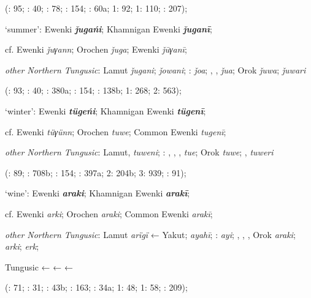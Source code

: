 \documentclass[output=paper,colorlinks,citecolor=brown]{langscibook}
\begin{document}
\begin{xlist}
    (\citealt{Castrén1856}: 95; \citealt{Janhunen1991}: 40; \citealt{Dorji1998}: 78; \citealt{Chaoke2014a}: 154; \citealt{Vasilevic1958}: 60a; \citealt{Cincius1975B} 1: 92; \citealt{Hauer1952} 1: 110; \citealt{Zikmundová2013a}: 207);

    \ex  ‘summer’:  Ewenki \textbf{\textit{ǰugańi}}; Khamnigan Ewenki \textbf{\textit{ǰuganī}};

    cf.  Ewenki \textit{ǰuγann}; Orochen \textit{ǰuga};  Ewenki \textit{ǰūγanī};

    \textit{other Northern Tungusic}: Lamut \textit{ǰugani};  \textit{ǰowani}; \textit{}:  \textit{ǰoa}; , ,  \textit{ǰua}; Orok \textit{ǰuwa};  \textit{ǰuwari} 
    
    (\citealt{Castrén1856}: 93; \citealt{Janhunen1991}: 40; \citealt{Dorji1998}: 380a; \citealt{Chaoke2014a}: 154; \citealt{Vasilevic1958}: 138b; \citealt{Cincius1975B} 1: 268; \citealt{Hauer1952} 2: 563);

    \ex  ‘winter’:  Ewenki \textbf{\textit{tügeńi}}; Khamnigan Ewenki \textbf{\textit{tügenī}};

    cf.  Ewenki \textit{tüγünn}; Orochen \textit{tuwe};  Common Ewenki \textit{tugenī};

    \textit{other Northern Tungusic}: Lamut,  \textit{tuweni}; \textit{}: , , ,  \textit{tue}; Orok \textit{tuwe}; ,  \textit{tuweri} 
    
    (\citealt{Castrén1856}: 89; \citealt{Dorji1998}: 708b; \citealt{Chaoke2014a}: 154; \citealt{Vasilevic1958}: 397a; \citealt{Cincius1975B} 2: 204b; \citealt{Hauer1952} 3: 939; \citealt{Stary1990}: 91);

    \ex  ‘wine’:  Ewenki \textbf{\textit{araki}}; Khamnigan Ewenki \textbf{\textit{arakī}};

    cf.  Ewenki \textit{arki}; Orochen \textit{araki};  Common Ewenki \textit{arakī};

    \textit{other Northern Tungusic}: Lamut \textit{arïgï} ← Yakut;  \textit{ayahī}; \textit{}:  \textit{ayi}; , , , Orok \textit{araki};  \textit{arki};  \textit{erk};

    Tungusic ←  ←  ← 
    
    (\citealt{Castrén1856}: 71; \citealt{Janhunen1991}: 31; \citealt{Dorji1998}: 43b; \citealt{Chaoke2014a}: 163; \citealt{Vasilevic1958}: 34a; \citealt{Cincius1975B} 1: 48; \citealt{Hauer1952} 1: 58; \citealt{Zikmundová2013a}: 209);
\end{xlist}
\z
\end{document}
